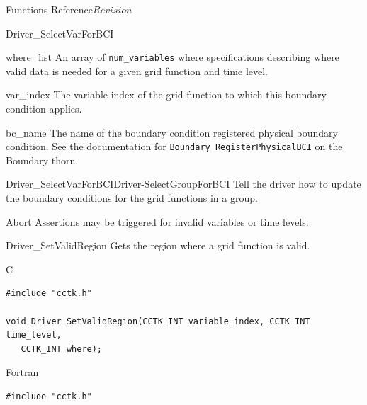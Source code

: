 \begin{cactuspart}{ Functions Reference}{}{$Revision$}
\begin{FunctionDescription}{Driver\_SelectVarForBCI}
\begin{ParameterSection}
\begin{Parameter}{where\_list}
An array of \texttt{num\_variables} where specifications describing
where valid data is needed for a given grid function and time level.
\end{Parameter}

\begin{Parameter}{var\_index}
The variable index of the grid function to which this boundary condition applies.
\end{Parameter}

\begin{Parameter}{bc\_name}
The name of the boundary condition registered physical boundary condition.
See the documentation for \texttt{Boundary\_RegisterPhysicalBCI} on the
Boundary thorn.
\end{Parameter}
\end{ParameterSection}

\begin{SeeAlsoSection}
\begin{SeeAlso2}{Driver\_SelectVarForBCI}{Driver-SelectGroupForBCI}
Tell the driver how to update the boundary conditions for the grid functions in a group.
\end{SeeAlso2}
\end{SeeAlsoSection}

\begin{ErrorSection}
\begin{Error}{Abort}
Assertions may be triggered for invalid variables or time levels.
\end{Error}
\end{ErrorSection}
\end{FunctionDescription}

\begin{FunctionDescription}{Driver\_SetValidRegion}
\label{Driver-SetValidRegion}
Gets the region where a grid function is valid.
\begin{SynopsisSection}
\begin{Synopsis}{C}
\begin{verbatim}
#include "cctk.h"

void Driver_SetValidRegion(CCTK_INT variable_index, CCTK_INT time_level,
   CCTK_INT where);

\end{verbatim}
\end{Synopsis}
\begin{Synopsis}{Fortran}
\begin{verbatim}
#include "cctk.h"


\end{verbatim}
\end{Synopsis}
\end{SynopsisSection}
\end{FunctionDescription}
\end{cactuspart}
